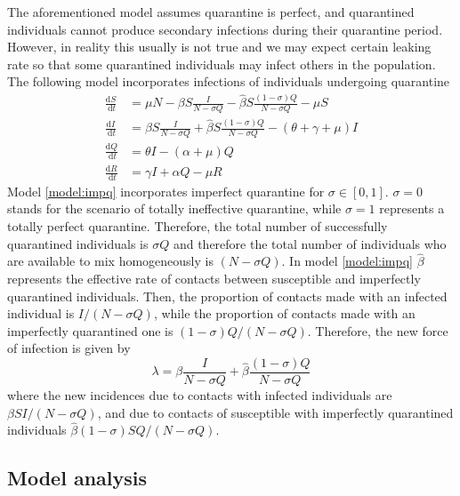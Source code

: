 \documentclass{book}\usepackage[]{graphicx}\usepackage[]{color}
\begin{document}
The aforementioned model assumes quarantine is perfect, and quarantined individuals cannot produce secondary infections during their quarantine period. However, in reality this usually is not true and we may expect certain leaking rate so that some quarantined individuals may infect others in the population. The following model incorporates infections of individuals undergoing quarantine
%
\begin{equation}
\label{model:impq}
\begin{split}
\frac{\mathrm{d} S}{\mathrm{~d} t} &=\mu N-\beta S \frac{I}{N-\sigma Q}-\hat{\beta} S \frac{(1-\sigma) Q}{N-\sigma Q}-\mu S \\
\frac{\mathrm{d} I}{\mathrm{~d} t} &=\beta S \frac{I}{N-\sigma Q}+\hat{\beta} S \frac{(1-\sigma) Q}{N-\sigma Q}-(\theta+\gamma+\mu) I \\
\frac{\mathrm{d} Q}{\mathrm{~d} t} &=\theta I-(\alpha+\mu) Q \\
\frac{\mathrm{d} R}{\mathrm{~d} t} &=\gamma I+\alpha Q-\mu R
  \end{split}
\end{equation}
%
Model \eqref{model:impq} incorporates imperfect quarantine for $\sigma\in[0,1]$. $\sigma=0$ stands for the scenario of totally ineffective quarantine, while $\sigma=1$ represents a totally perfect quarantine. Therefore, the total number of successfully quarantined individuals is $\sigma Q$ and therefore the total number of individuals who are available to mix homogeneously is $(N-\sigma Q)$.
%
In model \eqref{model:impq} $\hat{\beta}$ represents the effective rate of contacts between susceptible and imperfectly quarantined individuals.
%
Then, the proportion of contacts made with an infected individual is $I /(N-\sigma Q)$, while the proportion of contacts made with an imperfectly quarantined one is $(1-\sigma) Q /(N-\sigma Q)$. 
%
Therefore, the new force of infection is given by
\begin{equation}
\lambda=\beta \frac{I}{N-\sigma Q}+\hat{\beta} \frac{(1-\sigma) Q}{N-\sigma Q}
\end{equation}
%
where the new incidences due to contacts with infected individuals are $\beta S I /(N-\sigma Q)$, and due to contacts of susceptible with imperfectly quarantined individuals $\hat{\beta}(1-\sigma) S Q /(N-\sigma Q)$.

\subsection*{Model analysis}
\end{document}
